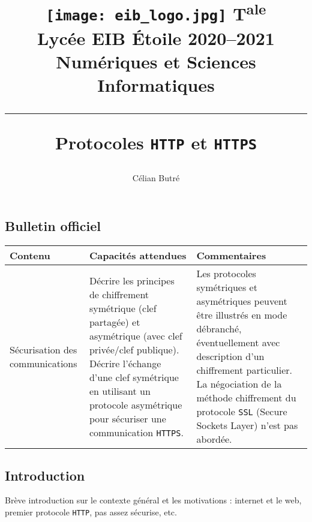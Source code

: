 \documentclass[a4paper,11pt]{article}
\title{
{\normalsize
\vspace*{-1.5cm}
\texttt{[image: eib\_logo.jpg]}
% 
\hfill
T\textsuperscript{ale}\\
Lycée EIB \'Etoile 2020--2021
\hfill
{\sc Numériques et Sciences Informatiques}
\hrule%
\vspace{5mm}%
}
{\sc Protocoles {\tt HTTP} et {\tt HTTPS}}  %
}%
\author{Célian {\sc Butré}}
\begin{document}
\maketitle       %
\tableofcontents %
\thispagestyle{fancy} %

\subsection*{Bulletin officiel} %

\begin{center}
\begin{tabular}{|p{5cm}|p{5cm}|p{5cm}|}\hline
{\bf Contenu} & {\bf Capacités attendues} & {\bf Commentaires}\\\hline
Sécurisation des communications
&
Décrire les principes de chiffrement symétrique (clef partagée) et asymétrique (avec clef privée/clef publique).
Décrire l'échange d'une clef symétrique en utilisant un protocole asymétrique pour sécuriser une communication {\tt HTTPS}.
&
Les protocoles symétriques et asymétriques peuvent être illustrés en mode débranché, éventuellement avec description d'un chiffrement particulier.
La négociation de la méthode chiffrement du protocole {\tt SSL} (Secure Sockets Layer) n'est pas abordée.
\\\hline
\end{tabular}
\end{center}

\subsection*{Introduction}

Brève introduction sur le contexte général et les motivations :
internet et le web, premier protocole {\tt HTTP}, pas assez sécurise, etc.
\end{document}
